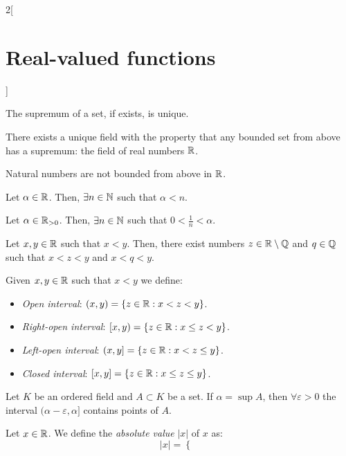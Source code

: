 \documentclass[../../../main_math.tex]{subfiles}
\begin{document}
\begin{multicols}{2}[\section{Real-valued functions}]
\begin{proposition}
  \end{proposition}
  \begin{proposition}
    The supremum of a set, if exists, is unique.
  \end{proposition}
  \begin{theorem}
    There exists a unique field with the property that any bounded set from above has a supremum: the field of real numbers $\mathbb{R}$.
  \end{theorem}
  \begin{proposition}
    Natural numbers are not bounded from above in $\mathbb{R}$.
  \end{proposition}
  \begin{corollary}
    Let $\alpha\in\mathbb{R}$. Then, $\exists n\in\mathbb{N}$ such that $\alpha<n$.
  \end{corollary}
  \begin{corollary}
    Let $\alpha\in\mathbb{R}_{>0}$. Then, $\exists n\in\mathbb{N}$ such that $0<\frac{1}{n}<\alpha$.
  \end{corollary}
  \begin{proposition}
    Let $x,y\in\mathbb{R}$ such that $x<y$. Then, there exist numbers $z\in\mathbb{R}\setminus\mathbb{Q}$ and $q\in\mathbb{Q}$ such that $x<z<y$ and $x<q<y$.
  \end{proposition}
  \begin{definition}
    Given $x,y\in\mathbb{R}$ such that $x<y$ we define:
    \begin{itemize}
      \item \emph{Open interval}: $(x,y)=\{z\in\mathbb{R}:x<z<y\}$.
      \item \emph{Right-open interval}: $[x,y)=\{z\in\mathbb{R}:x\leq z<y\}$.
      \item \emph{Left-open interval}: $(x,y]=\{z\in\mathbb{R}:x<z\leq y\}$.
      \item \emph{Closed interval}: $[x,y]=\{z\in\mathbb{R}:x\leq z\leq y\}$.
    \end{itemize}
  \end{definition}
  \begin{lemma}
    Let $K$ be an ordered field and $A\subset K$ be a set. If $\alpha=\sup A$, then $\forall \varepsilon>0$ the interval $(\alpha-\varepsilon,\alpha]$ contains points of $A$.
  \end{lemma}
  \begin{definition}
    Let $x\in\mathbb{R}$. We define the \emph{absolute value} $|x|$ of $x$ as:
    \begin{equation*}
      |x|=\begin{cases}

\end{cases}
\end{equation*}
\end{definition}
\end{multicols}
\end{document}
